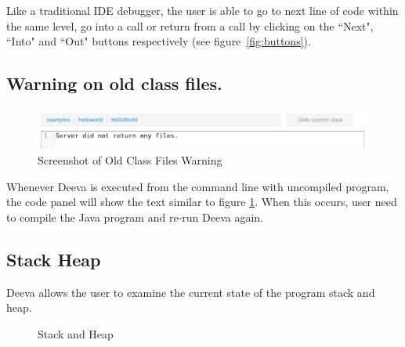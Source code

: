 \documentclass[11pt, a4paper]{article}
\begin{document}
Like a traditional IDE debugger, the user is able to go to next line of code within the same level, go into a call or return from a call by clicking on the ``Next", ``Into" and ``Out" buttons respectively (see figure~\ref{fig:buttons}).

\subsection{Warning on old class files.}
\begin{figure}[h!]
\centering
\includegraphics[scale=0.6]{warningFeature.png}
\caption{Screenshot of Old Class Files Warning}
\label{fig:warningFeature}
\end{figure}
Whenever Deeva is executed from the command line with uncompiled program, the code panel will show the text similar to figure \ref{fig:warningFeature}. When this occurs, user need to compile the Java program and re-run Deeva again.

\subsection{Stack Heap}
Deeva allows the user to examine the current state of the program stack and heap.
\begin{figure}[h!]
\centering
{}
\quad
{}
\caption{Stack and Heap}
\end{figure}
\end{document}
